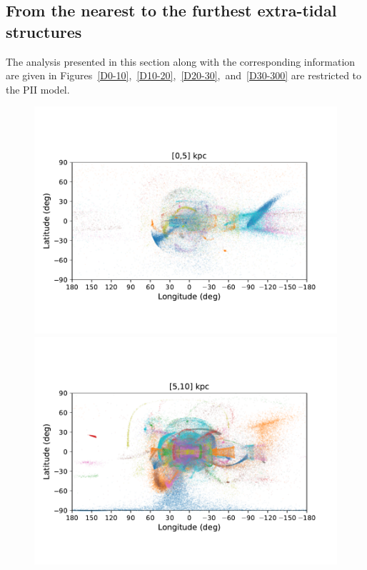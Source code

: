     \subsection{From the nearest to the furthest extra-tidal structures}\label{streamvsD}

    The analysis presented in this section along with the corresponding information are given in Figures~\ref{D0-10},~\ref{D10-20},~\ref{D20-30},~and~\ref{D30-300} are restricted to the PII model.

    \twocolumn
    \begin{figure}[h!]
        \begin{center}
            \includegraphics[clip=true, trim = 0mm 15mm 0mm 20mm, width=\columnwidth]{images/PII_ensemble_LB_D0-5_scatter.pdf}
            \includegraphics[clip=true, trim = 0mm 15mm 0mm 20mm, width=\columnwidth]{images/PII_ensemble_LB_D5-10_scatter.pdf}


\end{center}
\end{figure}
